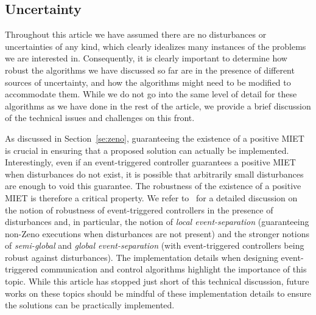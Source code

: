 \documentclass{autart}
\newcommand{\changes}[1]{{\color{blue} #1}}
\renewcommand{\changes}[1]{#1}
\begin{document}

\subsection{Uncertainty}\label{se:uncertainties}

Throughout this article we have assumed there are no disturbances or
uncertainties of any kind, which clearly idealizes many instances of
the problems we are interested in. Consequently, it is clearly
important to determine how robust the algorithms we have discussed so
far are in the presence of different sources of uncertainty, and how
the algorithms might need to be modified to accommodate them.  While
we do not go into the same level of detail for these algorithms as we
have done in the rest of the article, we provide a brief discussion of
the technical issues and challenges on this front.

\changes{As discussed in Section~\ref{se:zeno}, guaranteeing the
  existence of a positive MIET is crucial in ensuring that a proposed
  solution can actually be implemented.  Interestingly, even if an
  event-triggered controller guarantees a positive MIET when
  disturbances do not exist, it is possible that arbitrarily small
  disturbances are enough to void this guarantee. The robustness of
  the existence of a positive MIET is therefore a critical
  property. We refer to~\cite{DPB-WPMHH:14} for a detailed discussion
  on the notion of robustness of event-triggered controllers in the
  presence of disturbances and, in particular, the notion of
  \emph{local event-separation} (guaranteeing non-Zeno executions when
  disturbances are not present) and the stronger notions of
  \emph{semi-global} and \emph{global event-separation} (with
  event-triggered controllers being robust against disturbances).  The
  implementation details when designing event-triggered communication
  and control algorithms highlight the importance of this topic. While
  this article has stopped just short of this technical discussion,
  future works on these topics should be mindful of these
  implementation details to ensure the solutions can be practically
  implemented.  }
\end{document}
